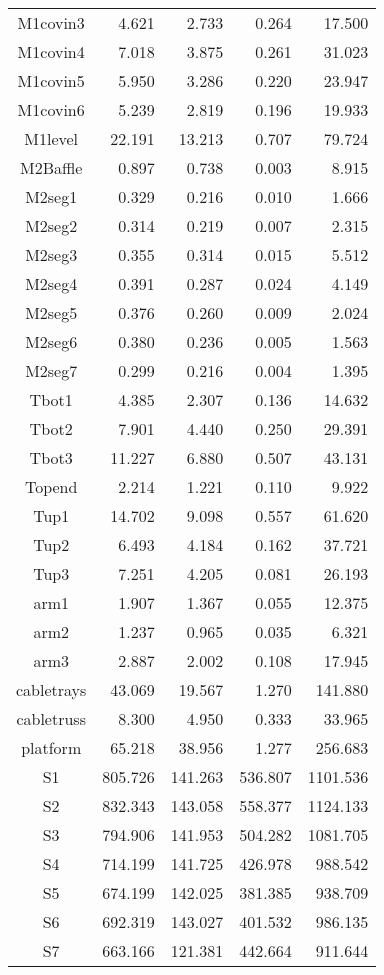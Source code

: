 \begin{longtable}{crrrr}
 M1covin3 & 4.621 & 2.733 & 0.264 & 17.500 \\
 M1covin4 & 7.018 & 3.875 & 0.261 & 31.023 \\
 M1covin5 & 5.950 & 3.286 & 0.220 & 23.947 \\
 M1covin6 & 5.239 & 2.819 & 0.196 & 19.933 \\
 M1level & 22.191 & 13.213 & 0.707 & 79.724 \\
 M2Baffle & 0.897 & 0.738 & 0.003 & 8.915 \\
 M2seg1 & 0.329 & 0.216 & 0.010 & 1.666 \\
 M2seg2 & 0.314 & 0.219 & 0.007 & 2.315 \\
 M2seg3 & 0.355 & 0.314 & 0.015 & 5.512 \\
 M2seg4 & 0.391 & 0.287 & 0.024 & 4.149 \\
 M2seg5 & 0.376 & 0.260 & 0.009 & 2.024 \\
 M2seg6 & 0.380 & 0.236 & 0.005 & 1.563 \\
 M2seg7 & 0.299 & 0.216 & 0.004 & 1.395 \\
 Tbot1 & 4.385 & 2.307 & 0.136 & 14.632 \\
 Tbot2 & 7.901 & 4.440 & 0.250 & 29.391 \\
 Tbot3 & 11.227 & 6.880 & 0.507 & 43.131 \\
 Topend & 2.214 & 1.221 & 0.110 & 9.922 \\
 Tup1 & 14.702 & 9.098 & 0.557 & 61.620 \\
 Tup2 & 6.493 & 4.184 & 0.162 & 37.721 \\
 Tup3 & 7.251 & 4.205 & 0.081 & 26.193 \\
 arm1 & 1.907 & 1.367 & 0.055 & 12.375 \\
 arm2 & 1.237 & 0.965 & 0.035 & 6.321 \\
 arm3 & 2.887 & 2.002 & 0.108 & 17.945 \\
 cabletrays & 43.069 & 19.567 & 1.270 & 141.880 \\
 cabletruss & 8.300 & 4.950 & 0.333 & 33.965 \\
 platform & 65.218 & 38.956 & 1.277 & 256.683 \\
 S1 & 805.726 & 141.263 & 536.807 & 1101.536 \\
 S2 & 832.343 & 143.058 & 558.377 & 1124.133 \\
 S3 & 794.906 & 141.953 & 504.282 & 1081.705 \\
 S4 & 714.199 & 141.725 & 426.978 & 988.542 \\
 S5 & 674.199 & 142.025 & 381.385 & 938.709 \\
 S6 & 692.319 & 143.027 & 401.532 & 986.135 \\
 S7 & 663.166 & 121.381 & 442.664 & 911.644 \\
\bottomrule
\end{longtable}


